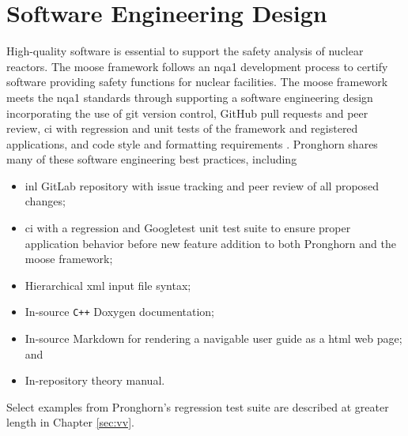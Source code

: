 \section{Software Engineering Design}
\label{sec:software}

High-quality software is essential to support the safety analysis of nuclear reactors. The \gls{moose} framework follows an \gls{nqa1} development process to certify software providing safety functions for nuclear facilities. The \gls{moose} framework meets the \gls{nqa1} standards through supporting a software engineering design incorporating the use of git version control, GitHub pull requests and peer review, \gls{ci} with regression and unit tests of the framework and registered applications, and code style and formatting requirements \cite{slaughter}. Pronghorn shares many of these software engineering best practices, including\mdash

\begin{itemize}
\itemsep0.3em
\item \gls{inl} GitLab repository with issue tracking and peer review of all proposed changes;
\item \gls{ci} with a regression and Googletest unit test suite to ensure proper application behavior before new feature addition to both Pronghorn and the \gls{moose} framework;
\item Hierarchical \gls{xml} input file syntax;
\item In-source \texttt{C++} Doxygen documentation;
\item In-source Markdown for rendering a navigable user guide as a \gls{html} web page; and
\item In-repository theory manual.
\end{itemize}

Select examples from Pronghorn's regression test suite are described at greater length in Chapter \ref{sec:vv}.
